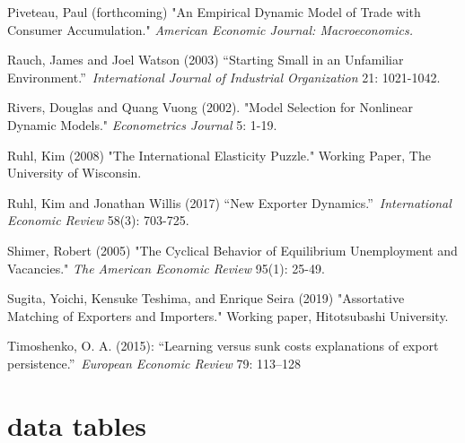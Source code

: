 \documentclass[12pt]{article}
\begin{document}
\begin{description}
\item Piveteau, Paul (forthcoming) "An Empirical Dynamic Model of Trade with
Consumer Accumulation." \textit{American Economic Journal: Macroeconomics.}

\item Rauch, James and Joel Watson (2003) \textquotedblleft Starting Small
in an Unfamiliar Environment.\textquotedblright\ \textit{International
Journal of Industrial Organization} 21: 1021-1042.

\item Rivers, Douglas and Quang Vuong (2002). "Model Selection for Nonlinear
Dynamic Models." \textit{Econometrics Journal} 5: 1-19.

\item Ruhl, Kim (2008) "The International Elasticity Puzzle." Working Paper,
The University of Wisconsin.

\item Ruhl, Kim and Jonathan Willis (2017) \textquotedblleft New Exporter
Dynamics.\textquotedblright\ \textit{International Economic Review} 58(3):
703-725.

\item Shimer, Robert (2005) "The Cyclical Behavior of Equilibrium
Unemployment and Vacancies." \textit{The American Economic Review} 95(1):
 25-49.

\item Sugita, Yoichi, Kensuke Teshima, and Enrique Seira (2019) "Assortative
Matching of Exporters and Importers." Working paper, Hitotsubashi University.

\item Timoshenko, O. A. (2015): \textquotedblleft Learning versus sunk costs
explanations of export persistence.\textquotedblright\ \textit{European
Economic Review} 79: 113--128\pagebreak
\end{description}

\appendix

\section{data tables}

\label{sec:data_tables}
\end{document}
